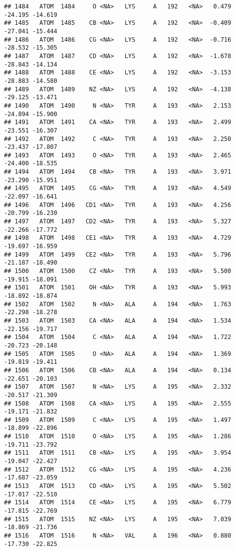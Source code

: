 \documentclass[
]{article}
\begin{document}
\begin{verbatim}
## 1484   ATOM  1484     O <NA>   LYS     A   192   <NA>   0.479 -24.195 -14.619
## 1485   ATOM  1485    CB <NA>   LYS     A   192   <NA>  -0.409 -27.041 -15.444
## 1486   ATOM  1486    CG <NA>   LYS     A   192   <NA>  -0.716 -28.532 -15.305
## 1487   ATOM  1487    CD <NA>   LYS     A   192   <NA>  -1.678 -28.843 -14.134
## 1488   ATOM  1488    CE <NA>   LYS     A   192   <NA>  -3.153 -28.883 -14.580
## 1489   ATOM  1489    NZ <NA>   LYS     A   192   <NA>  -4.138 -29.125 -13.471
## 1490   ATOM  1490     N <NA>   TYR     A   193   <NA>   2.153 -24.894 -15.900
## 1491   ATOM  1491    CA <NA>   TYR     A   193   <NA>   2.499 -23.551 -16.307
## 1492   ATOM  1492     C <NA>   TYR     A   193   <NA>   2.250 -23.437 -17.807
## 1493   ATOM  1493     O <NA>   TYR     A   193   <NA>   2.465 -24.400 -18.535
## 1494   ATOM  1494    CB <NA>   TYR     A   193   <NA>   3.971 -23.290 -15.951
## 1495   ATOM  1495    CG <NA>   TYR     A   193   <NA>   4.549 -22.097 -16.641
## 1496   ATOM  1496   CD1 <NA>   TYR     A   193   <NA>   4.256 -20.799 -16.230
## 1497   ATOM  1497   CD2 <NA>   TYR     A   193   <NA>   5.327 -22.266 -17.772
## 1498   ATOM  1498   CE1 <NA>   TYR     A   193   <NA>   4.729 -19.697 -16.959
## 1499   ATOM  1499   CE2 <NA>   TYR     A   193   <NA>   5.796 -21.187 -18.490
## 1500   ATOM  1500    CZ <NA>   TYR     A   193   <NA>   5.500 -19.915 -18.091
## 1501   ATOM  1501    OH <NA>   TYR     A   193   <NA>   5.993 -18.892 -18.874
## 1502   ATOM  1502     N <NA>   ALA     A   194   <NA>   1.763 -22.298 -18.278
## 1503   ATOM  1503    CA <NA>   ALA     A   194   <NA>   1.534 -22.156 -19.717
## 1504   ATOM  1504     C <NA>   ALA     A   194   <NA>   1.722 -20.723 -20.148
## 1505   ATOM  1505     O <NA>   ALA     A   194   <NA>   1.369 -19.819 -19.411
## 1506   ATOM  1506    CB <NA>   ALA     A   194   <NA>   0.134 -22.651 -20.103
## 1507   ATOM  1507     N <NA>   LYS     A   195   <NA>   2.332 -20.517 -21.309
## 1508   ATOM  1508    CA <NA>   LYS     A   195   <NA>   2.555 -19.171 -21.832
## 1509   ATOM  1509     C <NA>   LYS     A   195   <NA>   1.497 -18.899 -22.896
## 1510   ATOM  1510     O <NA>   LYS     A   195   <NA>   1.286 -19.711 -23.792
## 1511   ATOM  1511    CB <NA>   LYS     A   195   <NA>   3.954 -19.047 -22.427
## 1512   ATOM  1512    CG <NA>   LYS     A   195   <NA>   4.236 -17.687 -23.059
## 1513   ATOM  1513    CD <NA>   LYS     A   195   <NA>   5.502 -17.017 -22.510
## 1514   ATOM  1514    CE <NA>   LYS     A   195   <NA>   6.779 -17.815 -22.769
## 1515   ATOM  1515    NZ <NA>   LYS     A   195   <NA>   7.039 -18.869 -21.736
## 1516   ATOM  1516     N <NA>   VAL     A   196   <NA>   0.880 -17.730 -22.825

\end{verbatim}
\end{document}
